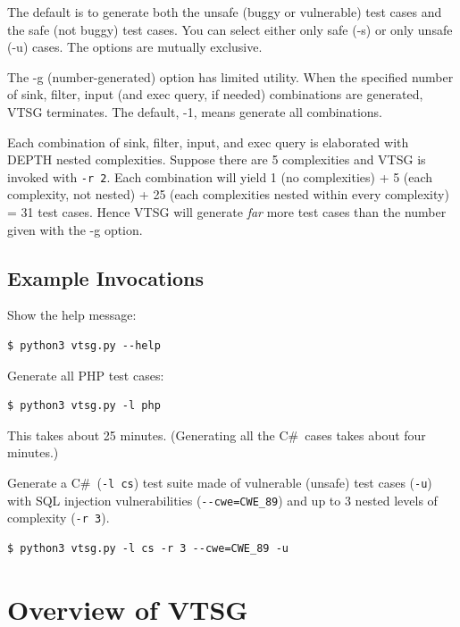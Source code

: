 \documentclass[12pt]{article}
\newcommand{\CSharp}{C{\fontseries{b}\selectfont\#}}
\begin{document}
The default is to generate both the unsafe (buggy or vulnerable)
test cases and the safe (not buggy) test cases.  You can select
either only safe (-s) or only unsafe (-u) cases.  The options are
mutually exclusive.

The -g (number-generated) option has limited utility.  When the
specified number of sink, filter, input (and exec query, if needed)
combinations are generated, VTSG terminates.  The default, -1,
means generate all combinations.

Each combination of sink, filter, input, and exec query is elaborated
with DEPTH nested complexities.  Suppose there are 5 complexities
and VTSG is invoked with \verb|-r 2|.  Each combination will yield
1 (no complexities) + 5 (each complexity, not nested) + 
25 (each complexities nested within every complexity) = 31 test cases.  
Hence VTSG will generate \emph{far} more test cases than the number
given with the -g option.

\subsection{Example Invocations}

Show the help message:
\begin{verbatim}
$ python3 vtsg.py --help
\end{verbatim}

Generate all PHP test cases:
\begin{verbatim}
$ python3 vtsg.py -l php
\end{verbatim}

This takes about 25 minutes.  (Generating all the \CSharp\ cases takes about four
minutes.)

Generate a \CSharp\ (\verb|-l cs|) test suite made of vulnerable (unsafe) test
cases (\verb|-u|) with SQL injection vulnerabilities (\verb|--cwe=CWE_89|)
and up to 3 nested levels of complexity (\verb|-r 3|).
\begin{verbatim}
$ python3 vtsg.py -l cs -r 3 --cwe=CWE_89 -u
\end{verbatim}
 
\section{Overview of VTSG}
\end{document}

